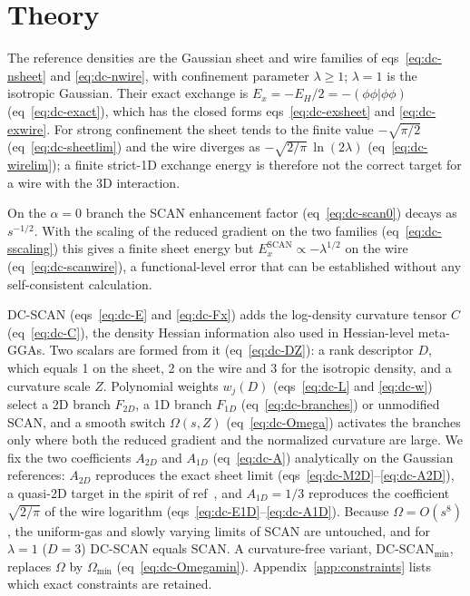 \documentclass[journal=jctcce,manuscript=article]{achemso}
\begin{document}
\section{Theory}
\label{sec:theory}
The reference densities are the Gaussian sheet and wire families of
eqs~\ref{eq:dc-nsheet} and \ref{eq:dc-nwire}, with confinement parameter
$\lambda\ge1$; $\lambda=1$ is the isotropic Gaussian.  Their exact exchange is
$E_x=-E_H/2=-(\phi\phi|\phi\phi)$ (eq~\ref{eq:dc-exact}), which has the
closed forms eqs~\ref{eq:dc-exsheet} and \ref{eq:dc-exwire}.  For strong
confinement the sheet tends to the finite value $-\sqrt{\pi/2}$
(eq~\ref{eq:dc-sheetlim}) and the wire diverges as
$-\sqrt{2/\pi}\,\ln(2\lambda)$ (eq~\ref{eq:dc-wirelim}); a finite strict-1D
exchange energy is therefore not the correct target for a wire with the 3D
interaction.

On the $\alpha=0$ branch the SCAN enhancement factor (eq~\ref{eq:dc-scan0})
decays as $s^{-1/2}$.  With the scaling of the reduced gradient on the two
families (eq~\ref{eq:dc-sscaling}) this gives a finite sheet energy but
$E_x^{\mathrm{SCAN}}\propto-\lambda^{1/2}$ on the wire
(eq~\ref{eq:dc-scanwire}), a functional-level error that can be established
without any self-consistent calculation.

DC-SCAN (eqs~\ref{eq:dc-E} and \ref{eq:dc-Fx}) adds the log-density curvature
tensor $C$ (eq~\ref{eq:dc-C}), the density Hessian information also used in
Hessian-level meta-GGAs\cite{dabbaghi2026hessian}.  Two scalars are formed
from it (eq~\ref{eq:dc-DZ}): a rank descriptor $D$, which equals 1 on the
sheet, 2 on the wire and 3 for the isotropic density, and a curvature scale
$Z$.  Polynomial weights $w_j(D)$ (eqs~\ref{eq:dc-L} and \ref{eq:dc-w}) select a
2D branch $F_{2D}$, a 1D branch $F_{1D}$ (eq~\ref{eq:dc-branches}) or
unmodified SCAN, and a smooth switch $\Omega(s,Z)$ (eq~\ref{eq:dc-Omega})
activates the branches only where both the reduced gradient and the
normalized curvature are large.  We fix the two coefficients $A_{2D}$ and $A_{1D}$
(eq~\ref{eq:dc-A}) analytically on the Gaussian references: $A_{2D}$
reproduces the exact sheet limit (eqs~\ref{eq:dc-M2D}--\ref{eq:dc-A2D}), a
quasi-2D target in the spirit of ref~, and
$A_{1D}=1/3$ reproduces the coefficient $\sqrt{2/\pi}$ of the wire logarithm
(eqs~\ref{eq:dc-E1D}--\ref{eq:dc-A1D}).  Because $\Omega=O(s^8)$, the
uniform-gas and slowly varying limits of SCAN are untouched, and for
$\lambda=1$ ($D=3$) DC-SCAN equals SCAN.  A curvature-free variant,
DC-SCAN$_{\min}$, replaces $\Omega$ by $\Omega_{\min}$ (eq~\ref{eq:dc-Omegamin}).
Appendix~\ref{app:constraints} lists which exact constraints are retained.
\end{document}
